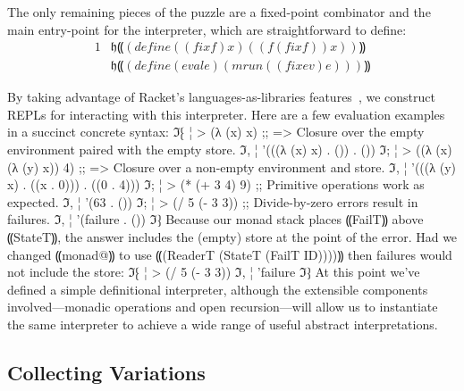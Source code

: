 The only remaining pieces of the puzzle are a fixed-point combinator and the
main entry-point for the interpreter, which are straightforward to define:
%
\begin{alignat*}{1}
& 𝔥⸨(define ((fix f) x) ((f (fix f)) x))⸩ \\
& 𝔥⸨(define (eval e) (mrun ((fix ev) e)))⸩
\end{alignat*}


By taking advantage of Racket's languages-as-libraries
features~\cite{dvanhorn:TobinHochstadt2011Languages}, we construct REPLs for
interacting with this interpreter.  Here are a few evaluation examples in a
succinct concrete syntax:
ℑ⁅
¦ > (λ (x) x)              ;; => Closure over the empty environment paired with the empty store.
ℑ,
¦ '(((λ (x) x) . ()) . ())
ℑ;
¦ > ((λ (x) (λ (y) x)) 4)  ;; => Closure over a non-empty environment and store.
ℑ,
¦ '(((λ (y) x) . ((x . 0))) . ((0 . 4)))
ℑ;
¦ > (* (+ 3 4) 9)          ;; Primitive operations work as expected.
ℑ,
¦ '(63 . ())
ℑ;
¦ > (/ 5 (- 3 3))          ;; Divide-by-zero errors result in failures.
ℑ,
¦ '(failure . ())
ℑ⁆
Because our monad stack places ⸨FailT⸩ above ⸨StateT⸩, the answer includes the
(empty) store at the point of the error. Had we changed ⸨monad@⸩ to use
⸨(ReaderT (StateT (FailT ID))))⸩ then failures would not include the store:
ℑ⁅
¦ > (/ 5 (- 3 3))
ℑ,
¦ 'failure
ℑ⁆
At this point we've defined a simple definitional interpreter, although the
extensible components involved—monadic operations and open recursion—will allow
us to instantiate the same interpreter to achieve a wide range of useful
abstract interpretations.

\subsection{Collecting Variations}\label{s:collecting}

